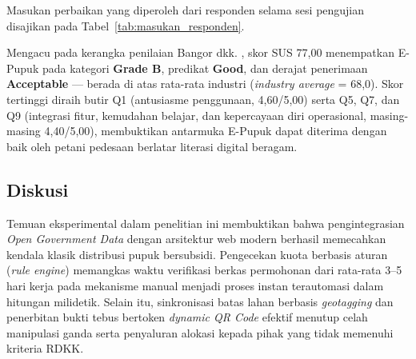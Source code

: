\documentclass[conference]{IEEEtran}
\begin{document}
Masukan perbaikan yang diperoleh dari responden selama sesi pengujian disajikan pada Tabel~\ref{tab:masukan_responden}.

\begin{table}[htbp]
\caption{Masukan Perbaikan dari Responden Pengujian}
\begin{center}
\label{tab:masukan_responden}
\end{center}
\end{table}

Mengacu pada kerangka penilaian Bangor dkk. \cite{b20}, skor SUS 77,00 menempatkan E-Pupuk pada kategori \textbf{Grade B}, predikat \textbf{Good}, dan derajat penerimaan \textbf{Acceptable} --- berada di atas rata-rata industri (\textit{industry average} = 68,0). Skor tertinggi diraih butir Q1 (antusiasme penggunaan, 4,60/5,00) serta Q5, Q7, dan Q9 (integrasi fitur, kemudahan belajar, dan kepercayaan diri operasional, masing-masing 4,40/5,00), membuktikan antarmuka E-Pupuk dapat diterima dengan baik oleh petani pedesaan berlatar literasi digital beragam.

\subsection{Diskusi}
Temuan eksperimental dalam penelitian ini membuktikan bahwa pengintegrasian \textit{Open Government Data} dengan arsitektur web modern berhasil memecahkan kendala klasik distribusi pupuk bersubsidi. Pengecekan kuota berbasis aturan (\textit{rule engine}) memangkas waktu verifikasi berkas permohonan dari rata-rata 3--5 hari kerja pada mekanisme manual menjadi proses instan terautomasi dalam hitungan milidetik. Selain itu, sinkronisasi batas lahan berbasis \textit{geotagging} dan penerbitan bukti tebus bertoken \textit{dynamic QR Code} efektif menutup celah manipulasi ganda serta penyaluran alokasi kepada pihak yang tidak memenuhi kriteria RDKK.
\end{document}
